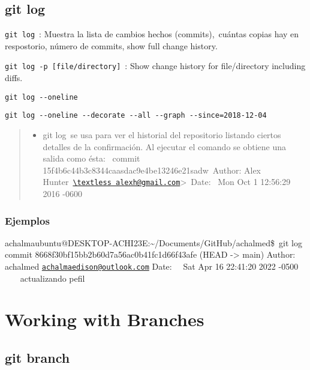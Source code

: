 \documentclass[
  a2paper,
]{article}
\providecommand{\tightlist}{%
  \setlength{\itemsep}{0pt}\setlength{\parskip}{0pt}}\usepackage{longtable,booktabs,array}
\begin{document}
\hypertarget{git-log}{%
\subsection{git log}\label{git-log}}

\texttt{git\ log}~: Muestra la lista de cambios hechos
(commits),~cuántas copias hay en respostorio, número de commits, show
full change history.

\texttt{git\ log\ -p\ {[}file/directory{]}}~: Show change history for
file/directory including diffs.

\texttt{git\ log\ -\/-oneline}

\texttt{git\ log\ -\/-oneline\ -\/-decorate\ -\/-all\ -\/-graph\ -\/-since=2018-12-04}

\begin{quote}
\begin{itemize}
\tightlist
\item
  git log~se usa para ver el historial del repositorio listando ciertos
  detalles de la confirmación. Al ejecutar el comando se obtiene una
  salida como ésta:~ commit
  15f4b6c44b3c8344caasdac9e4be13246e21sadw~Author: Alex
  Hunter~\href{mailto:\%3Calexh@gmail.com}{\nolinkurl{\textless alexh@gmail.com}}\textgreater~Date:
  \, Mon Oct 1 12:56:29 2016 -0600
\end{itemize}
\end{quote}

\hypertarget{ejemplos}{%
\subsubsection{Ejemplos}\label{ejemplos}}

achalmaubuntu@DESKTOP-ACHI23E:\textasciitilde/Documents/GitHub/achalmed\$~git
log commit 8668f30bf15bb2b60d7a56ac0b41fc1d66f43afe (HEAD
-\textgreater{} main) Author: achalmed
\href{mailto:achalmaedison@outlook.com}{\nolinkurl{achalmaedison@outlook.com}}
Date:~~ Sat Apr 16 22:41:20 2022 -0500 ~~~ actualizando pefil

\hypertarget{working-with-branches}{%
\section{Working with Branches}\label{working-with-branches}}

\hypertarget{git-branch}{%
\subsection{git branch}\label{git-branch}}
\end{document}

